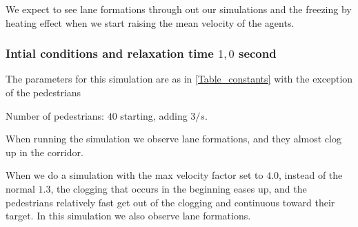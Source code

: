 We expect to see lane formations through out our simulations
and the freezing by heating effect when we start raising the mean velocity
of the agents.

\subsubsection{Intial conditions and relaxation time $1,0$ second}

The parameters for this simulation are as in \ref{Table_constants} with the exception of the pedestrians
\begin{itemize*}
    \item Number of pedestrians: $40$ starting, adding $3/s$.
\end{itemize*}

When running the simulation we observe lane formations, and they almost clog up
in the corridor.

When we do a simulation with the max velocity factor set to $4.0$, instead of the normal $1.3$, the clogging
that occurs in the beginning eases up, and the pedestrians relatively fast
get out of the clogging and continuous toward their target. In this simulation
we also observe lane formations.

